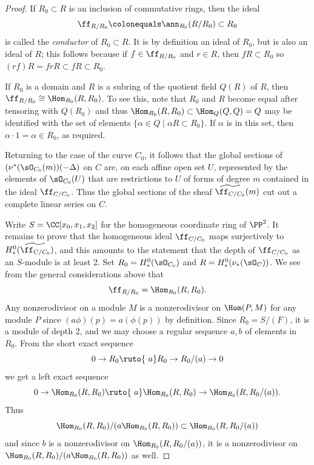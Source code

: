 \begin{proof}
If $R_{0}\subset R$ is an inclusion of commutative rings, then the ideal
$$\ff_{R/R_{0}} \colonequals  \ann_{R_{0}}(R/R_{0})\subset R_{0}$$
is called the \emph{conductor} of $R_{0}\subset R$.
%
It is by
definition an ideal of $R_{0}$, but is also an ideal of $R$; this follows
because if $f\in \ff_{R/R_{0}}$ and $r\in R$, then $fR\subset R_{0}$ so
 $(rf)R = frR \subset fR \subset R_{0}$.

If $R_{0}$ is a domain and $R$ is a subring of the quotient field $Q(R)$
of $R$, then
 $\ff_{R/R_{0}} \cong \Hom_{R_{0}}(R, R_{0})$. To see this, note that
 $R_{0}$ and $R$ become
 equal after tensoring with $Q(R_{0})$ and thus
 $\Hom_{R_{0}}(R,R_{0}) \subset \Hom_{Q}(Q,Q) = Q$
 may be identified
 with the set of elements $\{\alpha\in Q\mid \alpha R \subset R_{0}\}$. If
 $\alpha$ is in this set, then
  $\alpha\cdot 1 = \alpha \in R_{0}$, as required.

Returning to the case of the curve $C_{0}$, it follows that the global
sections of $(\nu^{*}(\sO_{C_{0}}(m))( -\Delta)$ on $C$
are, on each affine open set $U$, represented by the elements of
$\sO_{C_{0}}(U)$ that  are restrictions to $U$
of forms of degree $m$ contained in
the ideal $\ff_{C/C_{0}}$. Thus
the global sections of the sheaf $\widetilde{\ff_{C/C_{0}}}(m)$ cut out
a complete linear series on $C$.

Write $S =\CC[x_{0}, x_{1}, x_{2}]$ for the homogeneous coordinate ring
of $\PP^{2}$.
It remains to prove that the homogeneous ideal $\ff_{C/C_{0}}$ maps
surjectively to $H^{0}_{*}(\widetilde{\ff_{C/C_{0}}})$, and this amounts
to the
statement that the depth of $\ff_{C/C_{0}}$ as an $S$-module is
at least 2.
Set $R_{0} = H^{0}_{*}(\sO_{C_{0}})$ and $R = H^{0}_{*}(\nu_{*} (\sO_{C}))$.
We see from the general considerations above that
$$
\ff_{R/R_{0}} = \Hom_{R_{0}}(R, R_{0}).
$$
Any nonzerodivisor on a module $M$
is a nonzerodivisor on $\Hom(P, M)$ for any module $P$ since $(a\phi)(p)
= a(\phi(p))$ by definition.
Since $R_{0} = S/(F)$, it is a module of depth 2, and we may choose a
regular sequence
$a,b$ of elements in~$R_{0}$. From the short exact sequence
$$
0\to R_{0}\ruto {\ a} R_{0}\to R_{0}/(a) \to 0
$$
we get a left exact sequence
$$
0\to \Hom_{R_{0}}(R,R_{0})\ruto {\ a} \Hom_{R_{0}}(R,R_{0})\to
\Hom_{R_{0}}(R,R_{0}/(a)).
$$
Thus
$$
\Hom_{R_{0}}(R,R_{0})/(a\Hom_{R_{0}}(R,R_{0})) \subset
\Hom_{R_{0}}(R,R_{0}/(a))
$$
and since $b$ is a nonzerodivisor on $\Hom_{R_{0}}(R,R_{0}/(a))$, it is
a nonzerodivisor
on $\Hom_{R_{0}}(R,R_{0})/(a\Hom_{R_{0}}(R,R_{0}))$ as well.
\end{proof}

